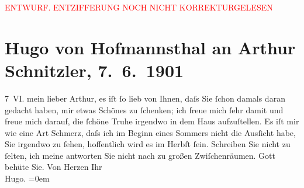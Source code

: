 
\begin{center}
            \textcolor{red}{ENTWURF. ENTZIFFERUNG NOCH NICHT KORREKTURGELESEN}
                      \end{center}
            
               \section[Hugo von Hofmannsthal an Arthur Schnitzler, 7. 6. 1901]{ Hugo von Hofmannsthal an Arthur Schnitzler, 7. 6. 1901}\nopagebreak{}\rehead{ }\begin{ledgroupsized}[t]{13cm}\normalsize\beginnumbering{} \toendnotes[C]{\smallbreak\pagebreak[2]} 
\pstart
           \raggedleft{}{\pb}7 VI.\pend
           \pstart{}mein lieber Arthur, \pend\pstart
           es iſt ſo lieb von Ihnen, daſs Sie ſchon damals daran gedacht haben, mir etwas
               Schönes zu ſchenken; ich freue mich ſehr damit und freue mich darauf, die ſchöne
               Truhe irgendwo in dem Haus aufzuſtellen.\pend
           \pstart
           {\pb}Es iſt mir wie eine Art Schmerz,
               daſs ich im Beginn eines Sommers nicht die Ausſicht habe, Sie irgendwo
               zu ſehen, hoffentlich wird es im Herbſt{ }ſein. Schreiben Sie nicht zu ſelten, ich meine
               antworten Sie nicht nach zu großen Zwiſchenräumen.\pend
           \pstart
           {\pb}Gott behüte Sie.\pend
           \pstart
           Von Herzen Ihr{\\[\baselineskip]}\spacefill\mbox{Hugo.}\pend
           \leftskip=0em{}\endnumbering{}\end{ledgroupsized}  \newcommand{\dateiname}{L01126}\newcommand{\titel}{Hugo von Hofmannsthal an Arthur Schnitzler, 7. 6. 1901}\newcommand{\editorInnen}{Martin Anton Müller und Gerd-Hermann Susen}
      